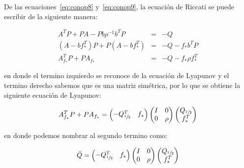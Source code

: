         De las ecuaciones~\ref{eq:conop8} y~\ref{eq:conop9}, la ecuación de Riccati se puede escribir de la siguiente manera:

        \begin{eqnarray*}
            A^T P + P A - P b \rho^{-1} b^T P & = & -Q \\
            (A - b f_{*}^T) P + P (A - b f_{*}^T) & = & -Q - f_{*} b^T P \\
            A_{f_*}^T P + P A_{f_*} & = & -Q - f_* \rho f_*^T
        \end{eqnarray*}

        en donde el termino izquierdo se reconoce de la ecuación de Lyapunov y el termino derecho sabemos que es una matriz simétrica, por lo que se obtiene la siguiente ecuación de Lyapunov:

        \begin{equation} \label{eq:conop11}
            A_{f_*}^T P + P A_{f_*} =
            \begin{pmatrix}
                -Q_{\sfrac{1}{2}}^T & f_*
            \end{pmatrix}
            \begin{pmatrix}
                I & 0 \\
                0 & \rho
            \end{pmatrix}
            \begin{pmatrix}
                Q_{\sfrac{1}{2}} \\
                f_*^T
            \end{pmatrix}
        \end{equation}

        en donde podemos nombrar al segundo termino como:

        \begin{equation*}
            \bar{Q} =
            \begin{pmatrix}
                -Q_{\sfrac{1}{2}}^T & f_*
            \end{pmatrix}
            \begin{pmatrix}
                I & 0 \\
                0 & \rho
            \end{pmatrix}
            \begin{pmatrix}
                Q_{\sfrac{1}{2}} \\
                f_*^T
            \end{pmatrix}
        \end{equation*}

